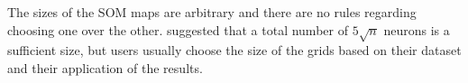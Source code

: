       
    The sizes of the SOM maps are arbitrary and there are no rules regarding choosing one over the other. 
    \citet{Vesanto05} suggested that a total number of $5\sqrt{n}$ neurons is a sufficient size, but users usually choose the size of the grids based on their dataset and their application of the results.

   
 
 

 
